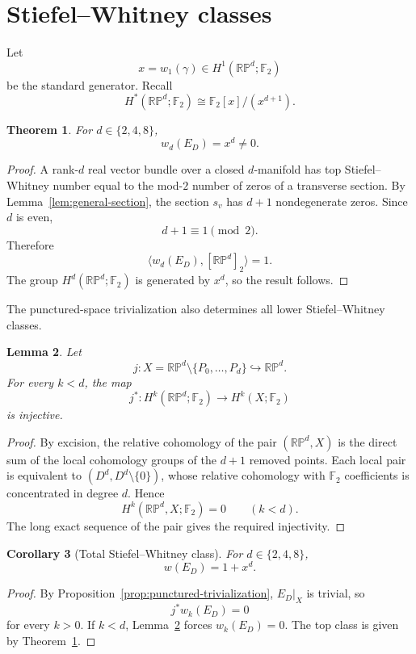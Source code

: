 \documentclass[12pt]{article}
\theoremstyle{plain}
\newtheorem{theorem}{Theorem}[section]
\newtheorem{lemma}[theorem]{Lemma}
\newtheorem{corollary}[theorem]{Corollary}
\theoremstyle{definition}
\newcommand{\F}{\mathbb F}
\newcommand{\RP}{\mathbb{RP}}
\begin{document}
\section{Stiefel--Whitney classes}
\label{sec:sw}

Let
\[
x=w_1(\gamma)\in H^1(\RP^d;\F_2)
\]
be the standard generator. Recall
\[
H^*(\RP^d;\F_2)
\cong\F_2[x]/(x^{d+1}).
\]

\begin{theorem}
	\label{thm:top-class}
	For $d\in\{2,4,8\}$,
	\[
	w_d(E_D)=x^d\ne0.
	\]
\end{theorem}

\begin{proof}
	A rank-$d$ real vector bundle over a closed $d$-manifold has top
	Stiefel--Whitney number equal to the mod-$2$ number of zeros of a
	transverse section. By Lemma~\ref{lem:general-section}, the section
	$s_v$ has $d+1$ nondegenerate zeros. Since $d$ is even,
	\[
	d+1\equiv1\pmod2.
	\]
	Therefore
	\[
	\langle w_d(E_D),[\RP^d]_2\rangle=1.
	\]
	The group $H^d(\RP^d;\F_2)$ is generated by $x^d$, so the result follows.
\end{proof}

The punctured-space trivialization also determines all lower
Stiefel--Whitney classes.

\begin{lemma}
	\label{lem:cohomology-injection}
	Let
	\[
	j:X=\RP^d\setminus\{P_0,\ldots,P_d\}\hookrightarrow\RP^d.
	\]
	For every $k<d$, the map
	\[
	j^*:H^k(\RP^d;\F_2)\longrightarrow H^k(X;\F_2)
	\]
	is injective.
\end{lemma}

\begin{proof}
	By excision, the relative cohomology of the pair
	$(\RP^d,X)$ is the direct sum of the local cohomology groups of the
	$d+1$ removed points. Each local pair is equivalent to
	$(D^d,D^d\setminus\{0\})$, whose relative cohomology with $\F_2$
	coefficients is concentrated in degree $d$. Hence
	\[
	H^k(\RP^d,X;\F_2)=0
	\qquad(k<d).
	\]
	The long exact sequence of the pair gives the required injectivity.
\end{proof}

\begin{corollary}[Total Stiefel--Whitney class]
	\label{cor:total-sw}
	For $d\in\{2,4,8\}$,
	\[
	w(E_D)=1+x^d.
	\]
\end{corollary}

\begin{proof}
	By Proposition~\ref{prop:punctured-trivialization}, $E_D|_X$ is trivial,
	so
	\[
	j^*w_k(E_D)=0
	\]
	for every $k>0$. If $k<d$, Lemma~\ref{lem:cohomology-injection}
	forces $w_k(E_D)=0$. The top class is given by
	Theorem~\ref{thm:top-class}.
\end{proof}
\end{document}

